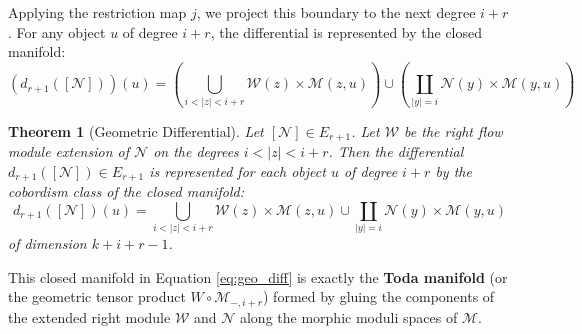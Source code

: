 \documentclass[a4paper,11pt]{article}
\theoremstyle{plain}
\newtheorem{thm}{Theorem}[section]
\theoremstyle{definition}
\theoremstyle{remark}
\newcommand{\flowM}{\mathcal{M}}
\begin{document}
Applying the restriction map $j$, we project this boundary to the next degree $i+r$. For any object $u$ of degree $i+r$, the differential is represented by the closed manifold:
\[
(d_{r+1}([\mathcal{N}]))(u) = \left( \bigcup_{i < |z| < i+r} \mathcal{W}(z) \times \flowM(z, u) \right) \cup \left( \coprod_{|y|=i} \mathcal{N}(y) \times \flowM(y, u) \right)
\]

\begin{thm}[Geometric Differential]
Let $[\mathcal{N}] \in E_{r+1}$. Let $\mathcal{W}$ be the right flow module extension of $\mathcal{N}$ on the degrees $i < |z| < i+r$. Then the differential $d_{r+1}([\mathcal{N}]) \in E_{r+1}$ is represented for each object $u$ of degree $i+r$ by the cobordism class of the closed manifold:
\begin{equation}\label{eq:geo_diff}
d_{r+1}([\mathcal{N}])(u) = \bigcup_{i < |z| < i+r} \mathcal{W}(z) \times \flowM(z, u) \cup \coprod_{|y|=i} \mathcal{N}(y) \times \flowM(y, u)
\end{equation}
of dimension $k+i+r-1$.
\end{thm}

This closed manifold in Equation \eqref{eq:geo_diff} is exactly the \textbf{Toda manifold} (or the geometric tensor product $W \circ \flowM_{-, i+r}$) formed by gluing the components of the extended right module $\mathcal{W}$ and $\mathcal{N}$ along the morphic moduli spaces of $\flowM$.
\end{document}
